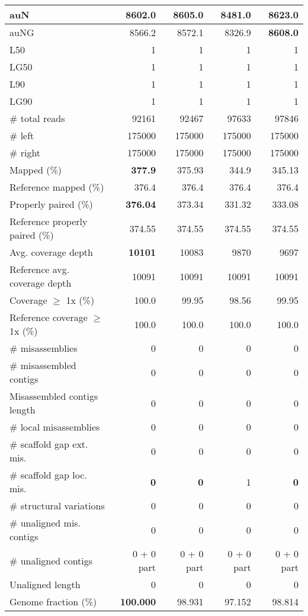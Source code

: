 \documentclass[12pt,a4paper]{article}
\begin{document}
\begin{table}[ht]
\begin{center}
\begin{tabular}{|l*{4}{|r}|}
auN & 8602.0 & 8605.0 & 8481.0 & {\bf 8623.0} \\ \hline
auNG & 8566.2 & 8572.1 & 8326.9 & {\bf 8608.0} \\ \hline
L50 & 1 & 1 & 1 & 1 \\ \hline
LG50 & 1 & 1 & 1 & 1 \\ \hline
L90 & 1 & 1 & 1 & 1 \\ \hline
LG90 & 1 & 1 & 1 & 1 \\ \hline
\# total reads & 92161 & 92467 & 97633 & 97846 \\ \hline
\# left & 175000 & 175000 & 175000 & 175000 \\ \hline
\# right & 175000 & 175000 & 175000 & 175000 \\ \hline
Mapped (\%) & {\bf 377.9} & 375.93 & 344.9 & 345.13 \\ \hline
Reference mapped (\%) & 376.4 & 376.4 & 376.4 & 376.4 \\ \hline
Properly paired (\%) & {\bf 376.04} & 373.34 & 331.32 & 333.08 \\ \hline
Reference properly paired (\%) & 374.55 & 374.55 & 374.55 & 374.55 \\ \hline
Avg. coverage depth & {\bf 10101} & 10083 & 9870 & 9697 \\ \hline
Reference avg. coverage depth & 10091 & 10091 & 10091 & 10091 \\ \hline
Coverage $\geq$ 1x (\%) & 100.0 & 99.95 & 98.56 & 99.95 \\ \hline
Reference coverage $\geq$ 1x (\%) & 100.0 & 100.0 & 100.0 & 100.0 \\ \hline
\# misassemblies & 0 & 0 & 0 & 0 \\ \hline
\# misassembled contigs & 0 & 0 & 0 & 0 \\ \hline
Misassembled contigs length & 0 & 0 & 0 & 0 \\ \hline
\# local misassemblies & 0 & 0 & 0 & 0 \\ \hline
\# scaffold gap ext. mis. & 0 & 0 & 0 & 0 \\ \hline
\# scaffold gap loc. mis. & {\bf 0} & {\bf 0} & 1 & {\bf 0} \\ \hline
\# structural variations & 0 & 0 & 0 & 0 \\ \hline
\# unaligned mis. contigs & 0 & 0 & 0 & 0 \\ \hline
\# unaligned contigs & 0 + 0 part & 0 + 0 part & 0 + 0 part & 0 + 0 part \\ \hline
Unaligned length & 0 & 0 & 0 & 0 \\ \hline
Genome fraction (\%) & {\bf 100.000} & 98.931 & 97.152 & 98.814 \\ \hline

\end{tabular}
\end{center}
\end{table}
\end{document}
